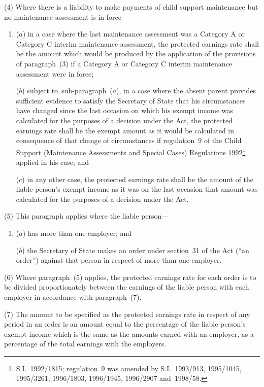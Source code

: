 \documentclass[12pt,a4paper]{article}
\begin{document}
(4) Where there is a liability to make payments of child support maintenance but no maintenance assessment is in force—
\begin{enumerate}\item[]
($a$) in a case where the last maintenance assessment was a Category A or Category C interim maintenance assessment, the protected earnings rate shall be the amount which would be produced by the application of the provisions of paragraph~(3) if a Category A or Category C interim maintenance assessment were in force;

($b$) subject to~sub-paragraph~($a$), in a case where the absent parent provides sufficient evidence to satisfy the Secretary of State that his circumstances have changed since the last occasion on which his exempt income was calculated for the purposes of a decision under the Act, the protected earnings rate shall be the exempt amount as it would be calculated in consequence of that change of circumstances if regulation~9 of the Child Support (Maintenance Assessments and Special Cases) Regulations 1992\footnote{\frenchspacing S.I.~1992/1815; regulation~9 was amended by S.I.~1993/913, 1995/1045, 1995/3261, 1996/1803, 1996/1945, 1996/2907 and~1998/58.} applied in his case; and

($c$) in any other case, the protected earnings rate shall be the amount of the liable person’s exempt income as it was on the last occasion that amount was calculated for the purposes of a decision under the Act.
\end{enumerate}

(5) This paragraph applies where the liable person—
\begin{enumerate}\item[]
($a$) has more than one employer; and

($b$) the Secretary of State makes an order under section~31 of the Act (“an order”) against that person in respect of more than one employer.
\end{enumerate}

(6) Where paragraph~(5) applies, the protected earnings rate for each order is to be divided proportionately between the earnings of the liable person with each employer in accordance with paragraph~(7).

(7) The amount to be specified as the protected earnings rate in respect of any period in an order is an amount equal to the percentage of the liable person’s exempt income which is the same as the amounts earned with an employer, as a percentage of the total earnings with the employers.
\end{document}
